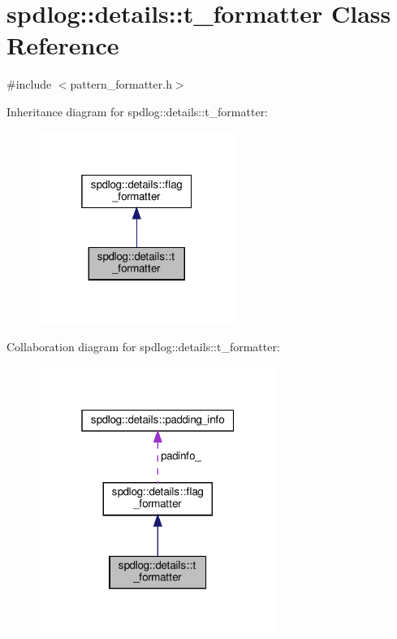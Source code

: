 \hypertarget{classspdlog_1_1details_1_1t__formatter}{}\section{spdlog\+:\+:details\+:\+:t\+\_\+formatter Class Reference}
\label{classspdlog_1_1details_1_1t__formatter}


{\ttfamily \#include $<$pattern\+\_\+formatter.\+h$>$}



Inheritance diagram for spdlog\+:\+:details\+:\+:t\+\_\+formatter\+:
\nopagebreak
\begin{figure}[H]
\begin{center}
\leavevmode
\includegraphics[width=181pt]{classspdlog_1_1details_1_1t__formatter__inherit__graph}
\end{center}
\end{figure}


Collaboration diagram for spdlog\+:\+:details\+:\+:t\+\_\+formatter\+:
\nopagebreak
\begin{figure}[H]
\begin{center}
\leavevmode
\includegraphics[width=220pt]{classspdlog_1_1details_1_1t__formatter__coll__graph}
\end{center}
\end{figure}
